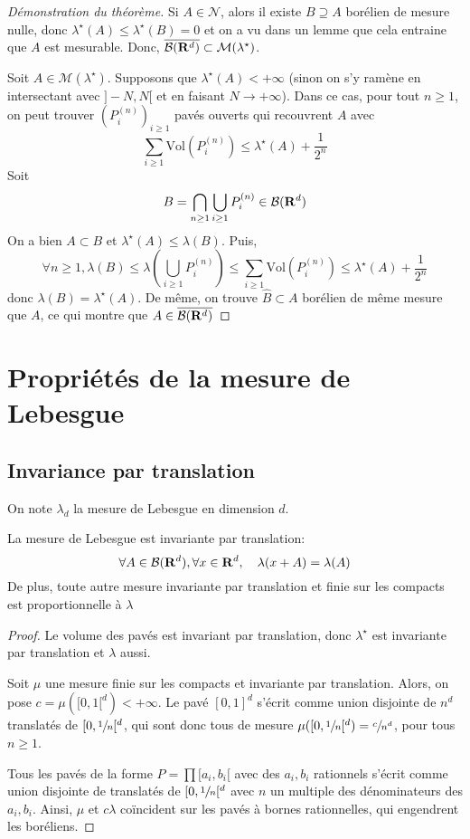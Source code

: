 \begin{proof}[Démonstration du théorème]
    Si $A \in  \mathcal N$, alors il existe $B\supseteq A$ borélien de mesure nulle, donc  $\lambda^\star(A)\leq \lambda^\star (B)=0$ et on a vu dans un lemme que cela entraine que $A$ est mesurable. Donc,  $\overline{\mathcal  B(\mathbf R^d)}\subset \mathcal  M(\lambda^\star)$.

    Soit $A \in  \mathcal  M(\lambda^\star)$. Supposons que $\lambda^\star(A)<+\infty$ (sinon on s'y ramène en intersectant avec $]-N,N[$ et en faisant  $N\to +\infty$). Dans ce cas, pour tout $n\geq 1$, on peut trouver $(P_i^{(n)})_{i\geq 1}$ pavés ouverts qui recouvrent  $A$ avec  \[
        \sum_{i\geq 1}\mathrm{Vol}(P_i^{(n)})\leq \lambda^\star(A)+ \frac1{2^n}
    \] 
    Soit  \[
        B=\bigcap_{n\geq 1}\bigcup _{i\geq 1}P_i^{(n)} \in  \mathcal  B(\mathbf R^d)
    \] 
    On a bien $A\subset B$ et  $\lambda^\star(A)\leq \lambda(B)$. Puis, \[
        \forall  n\geq 1, \lambda(B) \leq  \lambda \left( \bigcup_{i\geq 1} P_i^{(n)} \right)\leq \sum_{i\geq 1} \mathrm{Vol}(P_i^{(n)})\leq \lambda^\star(A)+\frac1{2^n}
    \] 
    donc $\lambda(B)=\lambda^\star(A)$. De même, on trouve  $\hat{B} \subset A$ borélien de même mesure que $A$, ce qui montre que  $A \in  \overline{\mathcal  B(\mathbf R^d)}$
\end{proof}

\section{Propriétés de la mesure de Lebesgue}

\subsection{Invariance par translation}

On note $\lambda_d$ la mesure de Lebesgue en dimension  $d$.

 \begin{thm}
La mesure de Lebesgue est invariante par translation: \[
    \forall  A \in  \mathcal  B(\mathbf R^d), \forall x \in  \mathbf R^d, \quad  \lambda(x+A)=\lambda(A)
\]
De plus, toute autre mesure invariante par translation et finie sur les compacts est proportionnelle à $\lambda$
\end{thm}

\begin{proof}
    Le volume des pavés est invariant par translation, donc $\lambda^\star$ est invariante par translation et $\lambda$ aussi.

    Soit $\mu$ une mesure finie sur les compacts et invariante par translation. Alors, on pose  $c=\mu([0,1[^d)<+\infty$. Le pavé  $[0,1]^d$ s'écrit comme union disjointe de  $n^d$ translatés de  $[0,\sfrac1n[^d$, qui sont donc tous de mesure $\mu([0,\sfrac1n[^d)=\sfrac c{n^d}$, pour tous  $n\geq 1$.

    Tous les pavés de la forme $P=\prod [a_i, b_i[$ avec des  $a_i,b_i$ rationnels s'écrit comme union disjointe de translatés de  $[0,\sfrac1n[^d$ avec  $n$ un multiple des dénominateurs des  $a_i,b_i$. Ainsi,  $\mu$ et  $c \lambda$ coïncident sur les pavés à bornes rationnelles, qui engendrent les boréliens.
\end{proof}

